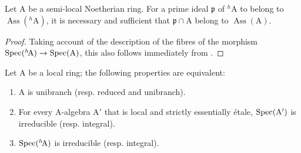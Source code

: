 \begin{corollary}[18.6.11]
\label{IV.18.6.11}
Let $\mathrm{A}$ be a semi-local Noetherian ring.
For a prime ideal $\mathfrak{p}$ of ${}^h\!\mathrm{A}$ to belong to $\operatorname{Ass}({}^h\!\mathrm{A})$, it is necessary and sufficient that $\mathfrak{p}\cap\mathrm{A}$ belong to $\operatorname{Ass}(\mathrm{A})$.
\end{corollary}

\begin{proof}
Taking account of the description of the fibres of the morphism $\operatorname{Spec}({}^h\!\mathrm{A})\to\operatorname{Spec}(\mathrm{A})$, this also follows immediately from .
\end{proof}

\begin{proposition}[18.6.12]
\label{IV.18.6.12}
Let $\mathrm{A}$ be a local ring;
the following properties are equivalent:
\begin{enumerate}[label=\emph{\alph*)}]
  \item A is unibranch  (resp. reduced and unibranch).
  \item For every A-algebra $\mathrm{A}'$ that is local and strictly essentially \'{e}tale, $\operatorname{Spec}(\mathrm{A}')$ is irreducible (resp. integral).
  \item $\operatorname{Spec}({}^h\!\mathrm{A})$ is irreducible (resp. integral).
\end{enumerate}
\end{proposition}

